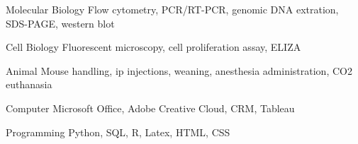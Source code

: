 

\begin{cvskills}

  \cvskill
    {Molecular Biology} %
    {Flow cytometry, PCR/RT-PCR, genomic DNA extration, SDS-PAGE, western blot} %

  \cvskill
    {Cell Biology} %
    {Fluorescent microscopy, cell proliferation assay, ELIZA} %

  \cvskill
    {Animal} %
    {Mouse handling, ip injections, weaning, anesthesia administration, CO2 euthanasia } %

  \cvskill
    {Computer} %
    {Microsoft Office, Adobe Creative Cloud, CRM, Tableau} %

  \cvskill
    {Programming} %
    {Python, SQL, R, Latex, HTML, CSS} %

\end{cvskills}
